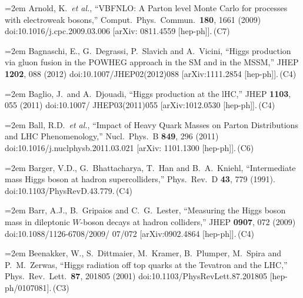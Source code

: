 \documentclass[letter,12pt]{article}
\def\xbibitem#1#2#3{\noindent\hangindent=2em #2\,(#3)}
\begin{document}
\xbibitem{Arnold:2008rz}{Arnold, K.\ {\it et al.},
  ``VBFNLO: A Parton level Monte Carlo for processes with electroweak bosons,''
  Comput.\ Phys.\ Commun.\  {\bf 180}, 1661 (2009)
  doi:10.1016/j.cpc.2009.03.006
  [arXiv: 0811.4559 [hep-ph]].}{C7}
  
\xbibitem{Bagnaschi:2011tu}{Bagnaschi, E., G.~Degrassi, P.~Slavich and A.~Vicini,
  ``Higgs production via gluon fusion in the POWHEG approach in the SM and in the MSSM,''
  JHEP {\bf 1202}, 088 (2012)
  doi:10.1007/JHEP02(2012)088
  [arXiv:1111.2854 [hep-ph]].}{C4}

\xbibitem{Baglio:2010ae}{Baglio, J.\ and A.~Djouadi,
  ``Higgs production at the lHC,''
  JHEP {\bf 1103}, 055 (2011)
  doi:10.1007/ JHEP03(2011)055
  [arXiv:1012.0530 [hep-ph]].}{C4}
  
\xbibitem{Ball:2011mu}{Ball, R.D.\ {\it et al.},
  ``Impact of Heavy Quark Masses on Parton Distributions and LHC Phenomenology,''
  Nucl.\ Phys.\ B {\bf 849}, 296 (2011)
  doi:10.1016/j.nuclphysb.2011.03.021
  [arXiv: 1101.1300 [hep-ph]].}{C6}
  
\xbibitem{Barger:1990mn}{Barger, V.D., G.~Bhattacharya, T.~Han and B.~A.~Kniehl,
  ``Intermediate mass Higgs boson at hadron supercolliders,''
  Phys.\ Rev.\ D {\bf 43}, 779 (1991).
  doi:10.1103/PhysRevD.43.779.}{C4}
  
\xbibitem{Barr:2009mx}{Barr, A.J., B.~Gripaios and C.~G.~Lester,
  ``Measuring the Higgs boson mass in dileptonic $W$-boson decays at hadron colliders,''
  JHEP {\bf 0907}, 072 (2009)
  doi:10.1088/1126-6708/2009/ 07/072
  [arXiv:0902.4864 [hep-ph]].}{C4}
  
\xbibitem{Beenakker:2001rj}{Beenakker, W., S.~Dittmaier, M.~Kramer, B.~Plumper, M.~Spira and P.~M.~Zerwas,
  ``Higgs radiation off top quarks at the Tevatron and the LHC,''
  Phys.\ Rev.\ Lett.\  {\bf 87}, 201805 (2001)
  doi:10.1103/PhysRevLett.87.201805
  [hep-ph/0107081].}{C3}
  
\end{document}
